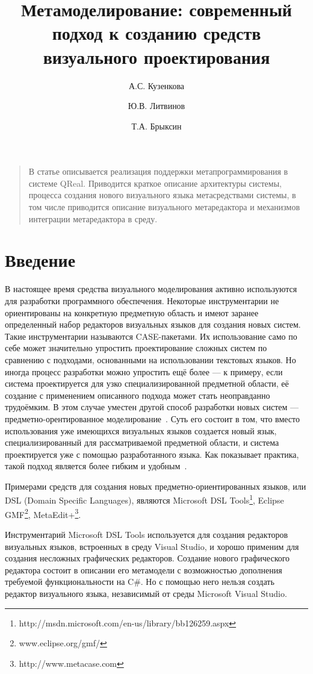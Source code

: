 \documentclass[a4paper]{article}
\title{Метамоделирование: современный подход к созданию средств визуального проектирования}
\author{А.С. Кузенкова \and Ю.В. Литвинов \and Т.А. Брыксин}
\date{}
\begin{document}
\maketitle
\thispagestyle{empty}

\begin{quote}
\small\noindent
В статье описывается реализация поддержки метапрограммирования в системе QReal. Приводится краткое описание архитектуры системы, процесса создания нового визуального языка метасредствами системы, в том числе приводится описание визуального метаредактора и механизмов интеграции метаредактора в среду.
\end{quote}

\section*{Введение}
В настоящее время средства визуального моделирования активно используются для разработки программного обеспечения. Некоторые инструментарии не ориентированы на конкретную предметную область и имеют заранее определенный набор редакторов визуальных языков для создания новых систем. Такие инструментарии называются CASE-пакетами. Их использование само по себе может значительно упростить проектирование сложных систем по сравнению с подходами, основанными на использовании текстовых языков. Но иногда процесс разработки можно упростить ещё более --- к примеру, если система проектируется для узко специализированной предметной области, её создание с применением описанного подхода может стать неоправданно трудоёмким. В этом случае уместен другой способ разработки новых систем --- предметно-орентированное моделирование~\cite{theBook}. Суть его состоит в том, что вместо использования уже имеющихся визуальных языков создается новый язык, специализированный для рассматриваемой предметной области, и система проектируется уже с помощью разработанного языка. Как показывает практика, такой подход является более гибким и удобным~\cite{kieburtz}.

Примерами средств для создания новых предметно-ориентированных языков, или DSL (Domain Specific Languages), являются Microsoft DSL Tools\footnote{http://msdn.microsoft.com/en-us/library/bb126259.aspx}, Eclipse GMF\footnote{www.eclipse.org/gmf/}, MetaEdit+\footnote{http://www.metacase.com}.

Инструментарий Microsoft DSL Tools используется для создания редакторов визуальных языков, встроенных в среду Visual Studio, и хорошо применим для создания несложных графических редакторов. Создание нового графического редактора состоит в описании его метамодели с возможностью дополнения требуемой функциональности на C\#. Но с помощью него нельзя создать редактор визуального языка, независимый от среды Microsoft Visual Studio.
\end{document}
